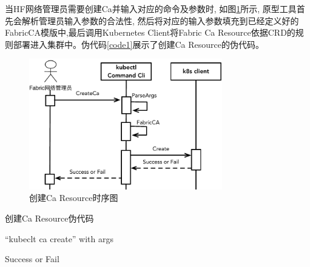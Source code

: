 当HF网络管理员需要创建Ca并输入对应的命令及参数时, 如图\ref{create_crd}所示, 原型工具首先会解析管理员输入参数的合法性, 然后将对应的输入参数填充到已经定义好的FabricCA模版中,最后调用Kubernetes Client将Fabric Ca Resource依据CRD的规则部署进入集群中。伪代码\ref{code1}展示了创建Ca Resource的伪代码。

\begin{figure}[!htbp] %
    \centering %
    \includegraphics[width=0.75\textwidth]{FIGs/chapter4/create_crd.pdf} %
    \caption{创建Ca Resource时序图} %
    \label{create_crd} %
\end{figure}%


\begin{algorithm}[!htbp]
    \caption{\footnotesize 创建Ca Resource伪代码}
    \label{code1}
    {\footnotesize
    \begin{algorithmic}
        \renewcommand{\algorithmicrequire}{ \textbf{Input:}}
        \REQUIRE  
        “kubeclt ca create” with args

        \renewcommand{\algorithmicensure}{\textbf{Output:}}
        \ENSURE
        Success or Fail




        \ELSE
        \ENDIF

    \end{algorithmic}
    }
\end{algorithm}

